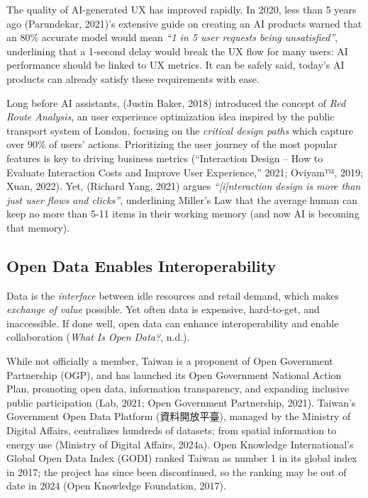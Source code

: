 \documentclass[
  12pt,
  letterpaper,
  DIV=11,
  numbers=noendperiod]{scrartcl}
\begin{document}
The quality of AI-generated UX has improved rapidly. In 2020, less than
5 years ago (Parundekar, 2021)'s extensive guide on creating an AI
products warned that an 80\% accurate model would mean \emph{``1 in 5
user requests being unsatisfied''}, underlining that a 1-second delay
would break the UX flow for many users: AI performance should be linked
to UX metrics. It can be safely said, today's AI products can already
satisfy these requirements with ease.

Long before AI assistants, (Justin Baker, 2018) introduced the concept
of \emph{Red Route Analysis}, an user experience optimization idea
inspired by the public transport system of London, focusing on the
\emph{critical design paths} which capture over 90\% of users' actions.
Prioritizing the user journey of the most popular features is key to
driving business metrics ({``Interaction {Design} -- {How} to {Evaluate
Interaction Costs} and {Improve User Experience},''} 2021; Oviyam™,
2019; Xuan, 2022). Yet, (Richard Yang, 2021) argues
\emph{``{[}i{]}nteraction design is more than just user flows and
clicks''}, underlining Miller's Law that the average human can keep no
more than 5-11 items in their working memory (and now AI is becoming
that memory).

\subsection{Open Data Enables
Interoperability}\label{open-data-enables-interoperability}

Data is the \emph{interface} between idle resources and retail demand,
which makes \emph{exchange of value} possible. Yet often data is
expensive, hard-to-get, and inaccessible. If done well, open data can
enhance interoperability and enable collaboration (\emph{What Is {Open
Data}?}, n.d.).

While not officially a member, Taiwan is a proponent of Open Government
Partnership (OGP), and has launched its Open Government National Action
Plan, promoting open data, information transparency, and expanding
inclusive public participation (Lab, 2021; Open Government Partnership,
2021). Taiwan's Government Open Data Platform (資料開放平臺), managed by
the Ministry of Digital Affairs, centralizes hundreds of datasets; from
spatial information to energy use (Ministry of Digital Affairs, 2024a).
Open Knowledge International's Global Open Data Index (GODI) ranked
Taiwan as number 1 in its global index in 2017; the project has since
been discontinued, so the ranking may be out of date in 2024 (Open
Knowledge Foundation, 2017).
\end{document}

